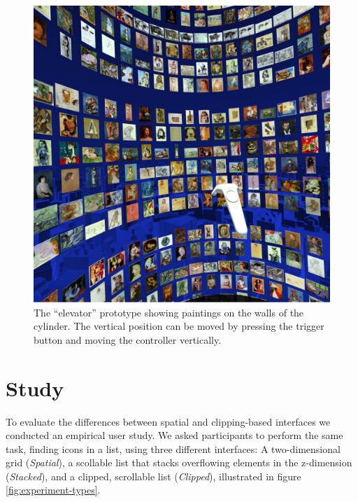\documentclass[nobib]{tufte-book} %
\begin{document}
\begin{figure}
  \includegraphics[width=\linewidth]{picassoinside.jpg}
  \caption{The ``elevator'' prototype showing paintings on the walls of the cylinder. The vertical position can be moved by pressing the trigger button and moving the controller vertically.}
  \label{fig:picassoinside}
\end{figure}


\chapter{Study}
\label{ch:study}

To evaluate the differences between spatial and clipping-based interfaces we conducted an empirical user study. We asked participants to perform the same task, finding icons in a list, using three different interfaces: A two-dimensional grid (\emph{Spatial}), a scollable list that stacks overflowing elements in the z-dimension (\emph{Stacked}), and a clipped, scrollable list (\emph{Clipped}), illustrated in figure \ref{fig:experiment-types}.
\end{document}
